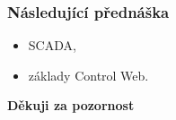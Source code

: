   \begin{frame}
    \frametitle{Následující přednáška}
		
		\begin{itemize}
			\item SCADA,
			\item základy Control Web.
		\end{itemize}
		
		\begin{center}
			\textbf{Děkuji za pozornost}
		\end{center}
		
	\end{frame}
